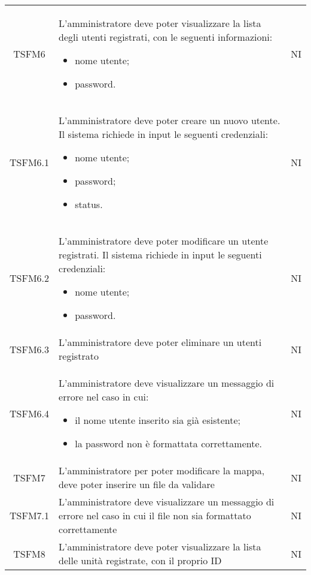 \begin{longtable}[h!] { c  m{12cm} c}
		TSFM6 & L'amministratore deve poter visualizzare la lista degli utenti registrati, con le seguenti informazioni:
					\begin{itemize}
						\item nome utente;
						\item password.	
					\end{itemize}
									& NI \\
		TSFM6.1 & L'amministratore deve poter creare un nuovo utente. Il sistema richiede in input le seguenti credenziali:
					\begin{itemize}
						\item nome utente;
						\item password;
						\item status.
					\end{itemize}
										& NI \\
										
		TSFM6.2  & L'amministratore deve poter modificare un utente registrati. Il sistema richiede in input le seguenti credenziali:
					\begin{itemize}
						\item nome utente;
						\item password.
					\end{itemize}
											& NI \\
		TSFM6.3 & L'amministratore deve poter eliminare un utenti registrato & NI \\
		
		TSFM6.4 & L'amministratore deve visualizzare un messaggio di errore nel caso in cui:
						\begin{itemize}
						\item il nome utente inserito sia già esistente; 
						\item la password non è formattata correttamente.
					\end{itemize}
										& NI \\
		TSFM7   & L'amministratore per poter modificare la mappa, deve poter inserire un file da validare & NI\\
		
		TSFM7.1 & L'amministratore deve visualizzare un messaggio di errore nel caso in cui il file non sia formattato correttamente & NI \\
		
		TSFM8   & L'amministratore deve poter visualizzare la lista delle unità registrate, con il proprio ID & NI\\
		

\end{longtable}
